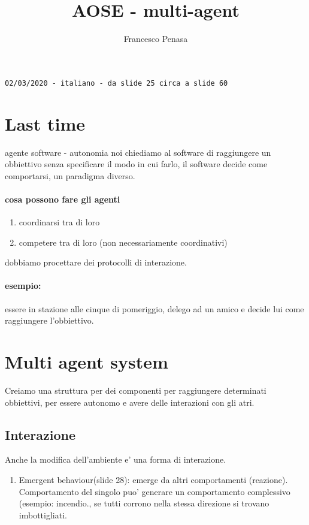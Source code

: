 \documentclass[11pt]{article}
\begin{document}
\author{Francesco Penasa}
\title{AOSE - multi-agent}
\maketitle

\medskip

\texttt{02/03/2020 - italiano - da slide 25 circa a slide 60}
\section{Last time} %
\label{sec:last_time}
agente software - autonomia
noi chiediamo al software di raggiungere un obbiettivo senza specificare il modo in cui farlo, il software decide come comportarsi, un paradigma diverso.

\paragraph{cosa possono fare gli agenti} %
\label{par:cosa_possono_fare_gli_agenti}
\begin{enumerate}
	\item coordinarsi tra di loro
	\item competere tra di loro (non necessariamente coordinativi)
\end{enumerate}
dobbiamo procettare dei protocolli di interazione.

\paragraph{esempio:} %
\label{par:esempio_}
essere in stazione alle cinque di pomeriggio, delego ad un amico e decide lui come raggiungere l'obbiettivo.


\section{Multi agent system} %
\label{sec:multi_agent_system}
Creiamo una struttura per dei componenti per raggiungere determinati obbiettivi, per essere autonomo e avere delle interazioni con gli atri.

\subsection{Interazione} %
\label{sub:interazione}
Anche la modifica dell'ambiente e' una forma di interazione.
\begin{enumerate}
	\item Emergent behaviour(slide 28): emerge da altri comportamenti (reazione). Comportamento del singolo puo' generare un comportamento complessivo (esempio: incendio., se tutti corrono nella stessa direzione si trovano imbottigliati.
\end{enumerate}
\end{document}
